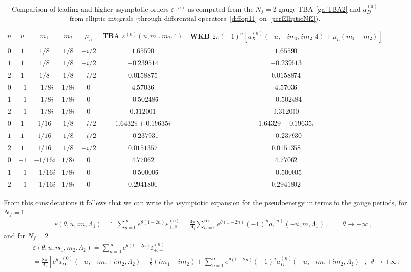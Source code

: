 \documentclass[11pt,a4paper]{elsarticle}
\def \th {\theta}
\def \ve {\varepsilon}
\def \ba {\begin{aligned}}
\def \ea {\end{aligned}}
\newcommand{\be}{\begin{equation}}
\newcommand{\ee}{\end{equation}}
\def\th{\theta}
\numberwithin{figure}{section}
\numberwithin{table}{section}
\begin{document}
\begin{table}[t]
\begin{tabular}{c|c|c|c|c|c|c}
$n$&$u$&$m_1$&$m_2$&$\mu_n$& TBA $\varepsilon^{(n)}(u,m_1,m_2,4)$ & WKB $ 2\pi (-1)^n  \left[a_D^{(n)}(-u,-im_1,i m_2 ,4)+\mu_n (m_1-m_2) \right]$\\
\hline
$0$&$1$&$1/8$&$1/8$&$-i/2$&$1.65590 $&$ 1.65590$\\$1$&$1$&$1/8$&$1/8$&$-i/2$&$-0.239514$&$-0.239513$\\
$2$&$1$&$1/8$&$1/8$&$-i/2$&$0.0158875$&$0.0158874$\\%
\hline
$0$&$-1$&$-1/8i$&$1/8i$&$0$&$4.57036 $&$4.57036 $\\
$1$&$-1$&$-1/8i$&$1/8i$&$0$&$-0.502486$&$-0.502484$\\
$2$&$-1$&$-1/8i$&$1/8i$&$0$&$0.312001$&$0.312000$\\
\hline
$0$&$1$&$1/16$&$1/8$&$-i/2$&$1.64329+0.19635 i $&$ 1.64329+0.19635 i$\\
$1$&$1$&$1/16$&$1/8$&$-i/2$&$-0.237931$&$-0.237930$\\
$2$&$1$&$1/16$&$1/8$&$-i/2$&$0.0151357$&$0.0151358$\\
\hline
$0$&$-1$&$-1/16i$&$1/8i$&$0$&$ 4.77062$&$4.77062 $\\
$1$&$-1$&$-1/16i$&$1/8i$&$0$&$-0.500006$&$-0.500005$\\
$2$&$-1$&$-1/16i$&$1/8i$&$0$&$0.2941800$&$0.2941802$
\end{tabular}
\caption{Comparison of leading and higher asymptotic orders $\varepsilon^{(n)}$ as computed from the $N_f=2$ gauge TBA~\eqref{ga-TBA2} and $a_D^{(n)}$ from elliptic integrals (through differential operators~\eqref{diffop11} on~\eqref{perEllipticNf2}).}
\label{tab:periods11WKB} 
\end{table}
\normalsize
From this considerations it follows that we can write the asymptotic expansion for the pseudoenergy in terms fo the gauge periods, for $N_f=1$
\be 
\ba \label{NSYexp1}
\ve(\th,u,i m,\Lambda_1) &\doteq \sum_{n=0}^\infty e^{\th (1-2n)}\ve^{(n)}_{+,0}= \frac{4 \pi}{\Lambda_1}\sum_{n=0}^\infty e^{\th (1-2n)}(-1)^n a^{(n)}_1(-u, m,\Lambda_1)\,,\qquad \th \to +\infty\,,
\ea 
\ee
and for $N_f=2$
\be 
\ba 
&\ve(\th,u,  m_1,  m_2,\Lambda_2) \doteq \sum_{n=0}^\infty e^{\th (1-2n)}\ve^{(n)}_{+,+}\\
&= \frac{8 \pi}{\Lambda_2}\left[e^\th a^{(0)}_D(-u,-i m,+i m_2 , \Lambda_2)-\frac{1}{2 }(i m_1- i m_2) +\sum_{n=1}^\infty e^{\th (1-2n)}(-1)^n a^{(n)}_D(-u,-i m,+i m_2 , \Lambda_2) \right],\,\,\,\th \to +\infty\,.
\ea 
\ee
\end{document}
